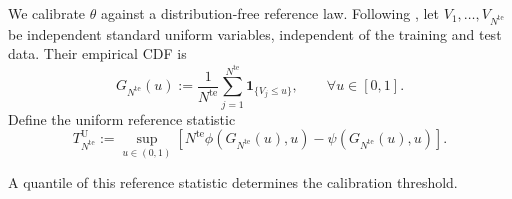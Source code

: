 \documentclass[review,11pt,3p,authoryear,nopreprintline]{elsarticle}
\begin{document}
We calibrate $\theta$ against a distribution-free reference law. Following \citet{L.J23}, let $V_1,\ldots,V_{N^{\mathrm{te}}}$ be independent standard uniform variables, independent of the training and test data. Their empirical CDF is
\begin{equation*}
  G_{N^{\mathrm{te}}}(u):=\frac{1}{N^{\mathrm{te}}}\sum_{j=1}^{N^{\mathrm{te}}}\mathbf 1_{\{V_j\le u\}},\qquad \forall u\in[0,1].
\end{equation*}
Define the uniform reference statistic
\begin{equation}
  T_{N^{\mathrm{te}}}^{\mathrm U}:=\sup_{u\in(0,1)}\left[N^{\mathrm{te}}\phi\!\left(G_{N^{\mathrm{te}}}(u),u\right)-\psi\!\left(G_{N^{\mathrm{te}}}(u),u\right)\right].
  \label{eq-dw-reference-statistic}
\end{equation}

A quantile of this reference statistic determines the calibration threshold.
\end{document}
